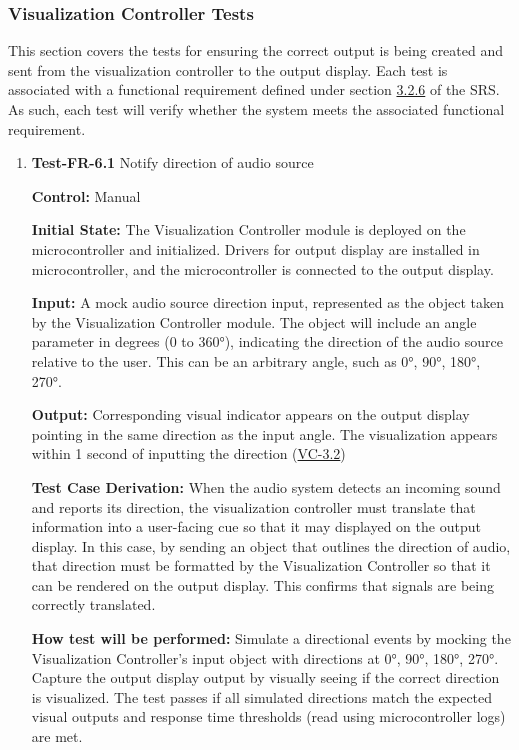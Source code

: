 \documentclass[12pt, titlepage]{article}
\begin{document}
\subsubsection{Visualization Controller Tests}

This section covers the tests for ensuring the correct output is being created
and sent from the visualization controller to the output display. Each test is
associated with a functional requirement defined under section
\hyperref[SRS-sec:FR6]{3.2.6} of the SRS. As such, each test will verify whether
the system meets the associated functional requirement. 

\begin{enumerate}

\item{\textbf{Test-FR-6.1} Notify direction of audio source \\}

\textbf{Control:} Manual
					
\textbf{Initial State:} 
The Visualization Controller module is deployed on the microcontroller and
initialized. Drivers for output display are installed in microcontroller, and
the microcontroller is connected to the output display. 
					
\textbf{Input:}
A mock audio source direction input, represented as the object taken by the
Visualization Controller module. The object will include an angle parameter in
degrees (0 to 360°), indicating the direction of the audio source relative to
the user. This can be an arbitrary angle, such as 0°, 90°, 180°, 270°. 
					
\textbf{Output:}
Corresponding visual indicator appears on the output display pointing in the
same direction as the input angle. The visualization appears within 1 second of
inputting the direction (\hyperref[SRS-sec:VC-3.2]{VC-3.2}) 

\textbf{Test Case Derivation:} 
When the audio system detects an incoming sound and reports its direction, the
visualization controller must translate that information into a user-facing cue
so that it may displayed on the output display. In this case, by sending an
object that outlines the direction of audio, that direction must be formatted by
the Visualization Controller so that it can be rendered on the output display.
This confirms that signals are being correctly translated.
					
\textbf{How test will be performed:}
Simulate a directional events by mocking the Visualization Controller's input
object with directions at 0°, 90°, 180°, 270°. Capture the output display output
by visually seeing if the correct direction is visualized. The test passes if
all simulated directions match the expected visual outputs and response time
thresholds (read using microcontroller logs) are met. 
					

\end{enumerate}
\end{document}
